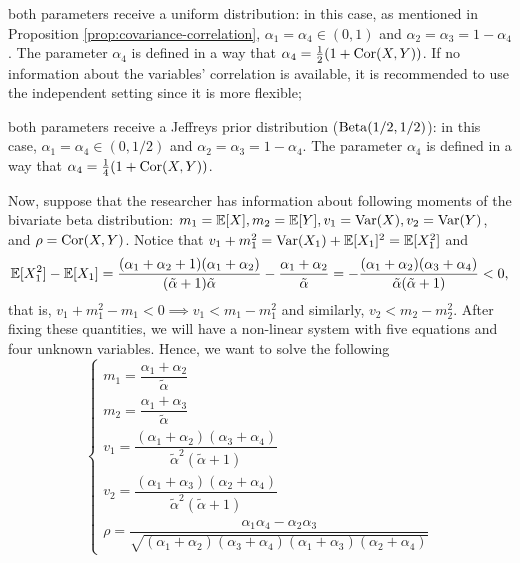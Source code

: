 \begin{alineas}
  \item both parameters receive a uniform distribution: in this case, as
  mentioned in Proposition \ref{prop:covariance-correlation}, $\alpha_1 =
  \alpha_4 \in (0,1)$ and $\alpha_2 = \alpha_3 = 1 - \alpha_4$. The parameter
  $\alpha_4$ is defined in a way that $\alpha_4 = \frac{1}{2}(1 + \operatorname{Cor}(X,Y))$.
  If no information about the variables' correlation is available, it is recommended to use
  the independent setting since it is more flexible;
  \item both parameters receive a Jeffreys prior distribution
  ($\operatorname{Beta}(1/2,1/2)$): in this case,  $\alpha_1 =
  \alpha_4 \in (0,1/2)$ and $\alpha_2 = \alpha_3 = 1 - \alpha_4$. The parameter
  $\alpha_4$ is defined in a way that $\alpha_4 = \frac{1}{4}(1 + \operatorname{Cor}(X,Y))$.
\end{alineas}

Now, suppose that the researcher has information about following moments of
the bivariate beta distribution: $m_1 = \mathbb{E}[X], m_2 = \mathbb{E}[Y], v_1 = \operatorname{Var}(X),
v_2 = \operatorname{Var}(Y)$, and $\rho  = \operatorname{Cor}(X,Y)$. Notice that $v_1 + m_1^2 = \operatorname{Var}(X_1)
+ \mathbb{E}[X_1]^2 = \mathbb{E}[X_1^2]$ and
$$
\mathbb{E}[X_1^2] - \mathbb{E}[X_1] = \frac{(\alpha_1 + \alpha_2 + 1)(\alpha_1 + \alpha_2)}{(\tilde{\alpha} + 1)\tilde{\alpha}} - \frac{\alpha_1 + \alpha_2}{\tilde{\alpha}} = -\frac{(\alpha_1 + \alpha_2)(\alpha_3 + \alpha_4)}{\tilde{\alpha}(\tilde{\alpha}+1)} < 0, 
$$
that is, $v_1 + m_1^2 - m_1 < 0 \implies v_1 < m_1 - m_1^2$ and similarly,
$v_2 < m_2 - m_2^2$. After fixing these quantities, we will have a non-linear system with five equations and four
unknown variables. Hence, we want to solve the following 
\begin{equation}
  \label{eq:system-moments-alpha}
  \begin{cases}
    m_1 = \dfrac{\alpha_1+\alpha_2}{\tilde{\alpha}} \\
    m_2 = \dfrac{\alpha_1+\alpha_3}{\tilde{\alpha}} \\ 
    v_1 = \dfrac{(\alpha_1+\alpha_2)(\alpha_3+\alpha_4)}{\tilde{\alpha}^2(\tilde{\alpha}+1)} \\
    v_2 = \dfrac{(\alpha_1+\alpha_3)(\alpha_2+\alpha_4)}{\tilde{\alpha}^2(\tilde{\alpha}+1)} \\
    \rho = \dfrac{\alpha_1\alpha_4 - \alpha_2\alpha_3}{\sqrt{(\alpha_1+\alpha_2)(\alpha_3+\alpha_4)(\alpha_1+\alpha_3)(\alpha_2+\alpha_4)}}
  \end{cases}
\end{equation}

